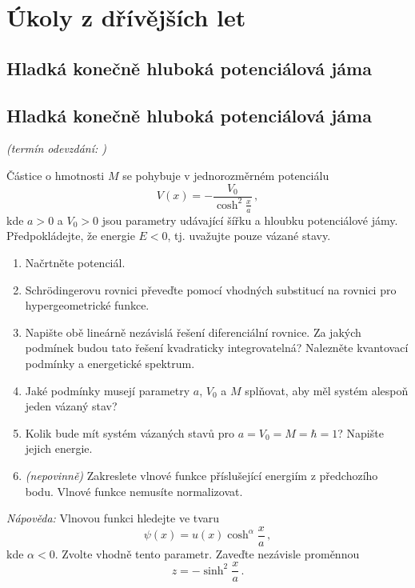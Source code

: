 \documentclass[a4paper,11pt,twoside]{book}
\def\np{\newpage}
\newcommand{\exercise}[2][]{\ifthenelse{\isempty{#1}}
	{\np\section{#2}}
	{\np\section{#2}\small{\it{(termín odevzdání: {#1})}\newline}}
}
\begin{document}
\appendix
\chapter{Úkoly z dřívějších let}
\exercise{Hladká konečně hluboká potenciálová jáma}
    Částice o hmotnosti $M$ se pohybuje v jednorozměrném potenciálu
    \begin{equation*}
        V(x)=-\frac{V_{0}}{\cosh^{2}\frac{x}{a}}\,,
    \end{equation*}
    kde $a>0$ a $V_{0}>0$ jsou parametry udávající šířku a hloubku potenciálové jámy.
    Předpokládejte, že energie $E<0$, tj. uvažujte pouze vázané stavy.

    \begin{enumerate}
    \item
        Načrtněte potenciál.

    \item
        Schrödingerovu rovnici převeďte pomocí vhodných substitucí na rovnici pro 
        hypergeometrické funkce.
        
    \item
        Napište obě lineárně nezávislá řešení diferenciální rovnice.
        Za jakých podmínek budou tato řešení kvadraticky integrovatelná?
        Nalezněte kvantovací podmínky a energetické spektrum.
        
    \item
        Jaké podmínky musejí parametry $a$, $V_{0}$ a $M$ splňovat, 
        aby měl systém alespoň jeden vázaný stav?
        
    \item
        Kolik bude mít systém vázaných stavů pro $a=V_{0}=M=\hbar=1$?
        Napište jejich energie.
        
    \item
        \emph{(nepovinně)} Zakreslete vlnové funkce příslušející energiím z předchozího bodu. 
        Vlnové funkce nemusíte normalizovat.
    \end{enumerate}
    \emph{Nápověda:}
        Vlnovou funkci hledejte ve tvaru
        \begin{equation*}
            \psi(x)=u(x)\cosh^{\alpha}\frac{x}{a}\,,
        \end{equation*}
        kde $\alpha<0$.
        Zvolte vhodně tento parametr.
        Zaveďte nezávisle proměnnou
        \begin{equation*}
            z=-\sinh^{2}\frac{x}{a}\,.
        \end{equation*}	
\end{document}
